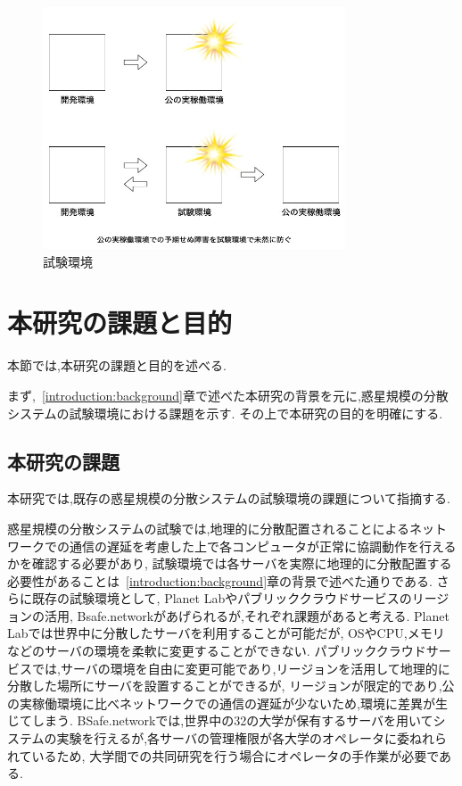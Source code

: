 \begin{figure}[htbp]
  \begin{center}
    \includegraphics[width=0.8\textwidth]{./figures/staging.jpg}
    \caption{試験環境}
  \end{center}
\end{figure}

\section{本研究の課題と目的}
\label{introduction:issue-aim}

本節では,本研究の課題と目的を述べる.

まず,~\ref{introduction:background}章で述べた本研究の背景を元に,惑星規模の分散システムの試験環境における課題を示す.
その上で本研究の目的を明確にする.

\subsection{本研究の課題}
\label{introduction:issue-aim:issue}

本研究では,既存の惑星規模の分散システムの試験環境の課題について指摘する.

惑星規模の分散システムの試験では,地理的に分散配置されることによるネットワークでの通信の遅延を考慮した上で各コンピュータが正常に協調動作を行えるかを確認する必要があり,
試験環境では各サーバを実際に地理的に分散配置する必要性があることは~\ref{introduction:background}章の背景で述べた通りである.
さらに既存の試験環境として, Planet Labやパブリッククラウドサービスのリージョンの活用, Bsafe.networkがあげられるが,それぞれ課題があると考える.
Planet Labでは世界中に分散したサーバを利用することが可能だが, OSやCPU,メモリなどのサーバの環境を柔軟に変更することができない.
パブリッククラウドサービスでは,サーバの環境を自由に変更可能であり,リージョンを活用して地理的に分散した場所にサーバを設置することができるが,
リージョンが限定的であり,公の実稼働環境に比べネットワークでの通信の遅延が少ないため,環境に差異が生じてしまう.
BSafe.networkでは,世界中の32の大学が保有するサーバを用いてシステムの実験を行えるが,各サーバの管理権限が各大学のオペレータに委ねれられているため,
大学間での共同研究を行う場合にオペレータの手作業が必要である.

